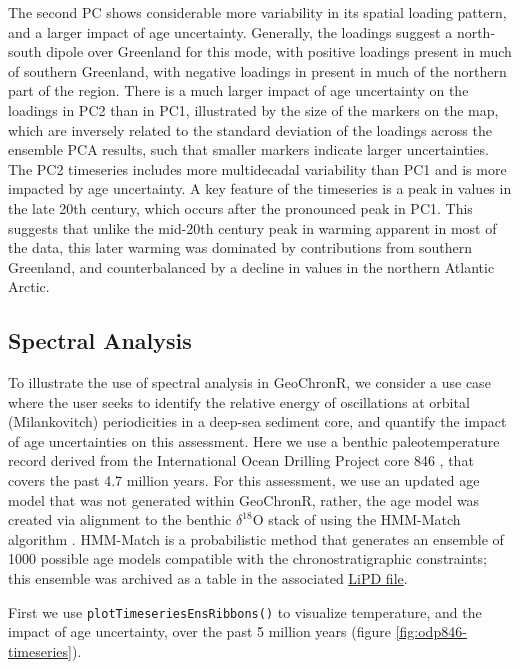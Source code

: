 \documentclass[gchron, manuscript]{copernicus}
\begin{document}
The second PC shows considerable more variability in its spatial loading pattern, and a larger impact of age uncertainty.
Generally, the loadings suggest a north-south dipole over Greenland for this mode, with positive loadings present in much of southern Greenland, with negative loadings in present in much of the northern part of the region.
There is a much larger impact of age uncertainty on the loadings in PC2 than in PC1, illustrated by the size of the markers on the map, which are inversely related to the standard deviation of the loadings across the ensemble PCA results, such that smaller markers indicate larger uncertainties.
The PC2 timeseries includes more multidecadal variability than PC1 and is more impacted by age uncertainty.
A key feature of the timeseries is a peak in values in the late 20th century, which occurs after the pronounced peak in PC1.
This suggests that unlike the mid-20th century peak in warming apparent in most of the data, this later warming was dominated by contributions from southern Greenland, and counterbalanced by a decline in values in the northern Atlantic Arctic.

\hypertarget{sec:spec_vignette}{%
\subsection{Spectral Analysis}\label{sec:spec_vignette}}

To illustrate the use of spectral analysis in GeoChronR, we consider a use case where the user seeks to identify the relative energy of oscillations at orbital (Milankovitch) periodicities in a deep-sea sediment core, and quantify the impact of age uncertainties on this assessment.
Here we use a benthic paleotemperature record derived from the International Ocean Drilling Project core 846 \citep{mix1995benthic, Shackleton95}, that covers the past 4.7 million years.
For this assessment, we use an updated age model that was not generated within GeoChronR, rather, the age model was created via alignment to the benthic \(\delta^{18}\mathrm{O}\) stack of \citet{LisieckiRaymo05} using the HMM-Match algorithm \citep{ProbStack, khider2017}.
HMM-Match is a probabilistic method that generates an ensemble of 1000 possible age models compatible with the chronostratigraphic constraints; this ensemble was archived as a table in the associated \href{http://lipdverse.org/geoChronR-examples/ODP846.Lawrence.2006.lpd}{LiPD file}.

First we use \texttt{plotTimeseriesEnsRibbons()} to visualize temperature, and the impact of age uncertainty, over the past 5 million years (figure \ref{fig:odp846-timeseries}).
\end{document}
